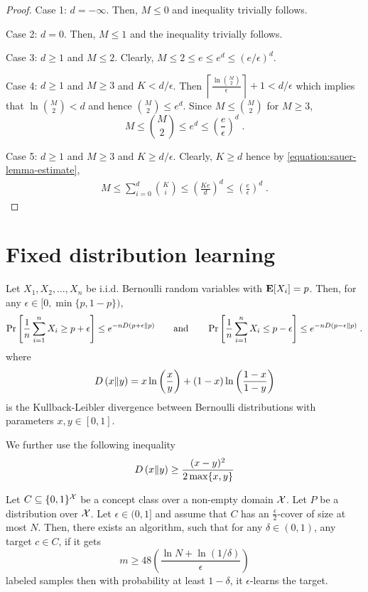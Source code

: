 \begin{proof}
Case 1: $d = -\infty$. Then, $M \le 0$ and inequality trivially follows.

Case 2: $d = 0$. Then, $M \le 1$ and the inequality trivially follows.

Case 3: $d \ge 1$ and $M \le 2$. Clearly, $M \le 2 \le e \le e^d \le (e/\epsilon)^d$.

Case 4: $d \ge 1$ and $M \ge 3$ and $K < d/\epsilon$. Then
$\left\lceil \frac{\ln \binom{M}{2}}{\epsilon} \right\rceil + 1 < d/\epsilon$
which implies that $\ln \binom{M}{2} < d$ and hence $\binom{M}{2} \le e^d$.
Since $M \le \binom{M}{2}$ for $M \ge 3$,
$$
M \le \binom{M}{2} \le e^d \le \left( \frac{e}{\epsilon} \right)^d \; .
$$

Case 5: $d \ge 1$ and $M \ge 3$ and $K \ge d/\epsilon$. Clearly, $K \ge d$ hence by \eqref{equation:sauer-lemma-estimate},
\begin{align*}
M
\le \sum_{i=0}^d \binom{K}{i}
\le \left( \frac{Ke}{d} \right)^d
\le \left( \frac{e}{\epsilon} \right)^d \; .
\end{align*}
\end{proof}

\section{Fixed distribution learning}
\label{section:fixed-distribution-learning}

\begin{theorem}
Let $X_1, X_2, \dots, X_n$ be i.i.d. Bernoulli random variables with $\operatorname{\mathbf{E}}[X_i] = p$.
Then, for any $\epsilon \in [0, \min\{p,1-p\})$,
$$
\Pr \left[{\frac {1}{n}} \sum_{i=1}^n X_i \ge p + \epsilon \right] \le e^{ - n D\left(p + \epsilon \middle\| p \right)}  \qquad \text{and} \qquad
\Pr \left[{\frac {1}{n}} \sum_{i=1}^n X_i \le p - \epsilon \right] \le e^{ - n D\left(p - \epsilon \middle\| p \right)}  \; . \\
$$
where
$$
D\left(x \middle\| y \right) = x \ln \left( \frac{x}{y} \right) + (1 - x) \ln \left( \frac{1-x}{1-y} \right)
$$
is the Kullback-Leibler divergence between Bernoulli distributions with parameters $x, y \in [0,1]$.
\end{theorem}

We further use the following inequality
$$
D\left(x \middle\| y \right) \ge \frac{(x-y)^2}{2 \max\{x, y\}}
$$


\begin{theorem}
\label{theorem:benedek-itai}
Let $C \subseteq \{0,1\}^{\mathcal{X}}$ be a concept class over a non-empty domain $\mathcal{X}$.
Let $P$ be a distribution over $\mathcal{X}$. Let $\epsilon \in (0,1]$ and assume that
$C$ has an $\frac{\epsilon}{2}$-cover of size at most $N$. Then, there exists an
algorithm, such that for any $\delta \in (0,1)$, any target $c \in C$, if it
gets
$$
m \ge 48\left(\frac{\ln N + \ln(1/\delta)}{\epsilon}\right)
$$
labeled samples then with probability at least $1 - \delta$, it
$\epsilon$-learns the target.
\end{theorem}

